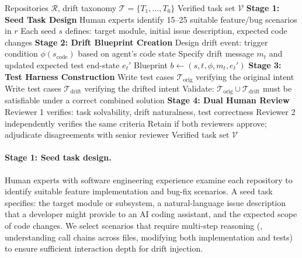 \begin{algorithm}[t]
\caption{Task Construction Pipeline for \bench{}-SWE}
\label{alg:pipeline}
\begin{algorithmic}[1]
\REQUIRE Repositories $\mathcal{R}$, drift taxonomy $\mathcal{T} = \{T_1, \ldots, T_6\}$
\ENSURE Verified task set $\mathcal{V}$
\STATE \textbf{Stage 1: Seed Task Design}
    \STATE Human experts identify 15--25 suitable feature/bug scenarios in $r$
    \STATE Each seed $s$ defines: target module, initial issue description, expected code changes
\ENDFOR
\STATE \textbf{Stage 2: Drift Blueprint Creation}
    \STATE Design drift event: trigger condition $\phi(s_{\text{code}})$ based on agent's code state
    \STATE Specify drift message $m_t$ and updated expected test end-state $e_t'$
    \STATE Blueprint $b \leftarrow (s, t, \phi, m_t, e_t')$
\ENDFOR
\STATE \textbf{Stage 3: Test Harness Construction}
    \STATE Write test cases $\mathcal{T}_{\text{orig}}$ verifying the original intent
    \STATE Write test cases $\mathcal{T}_{\text{drift}}$ verifying the drifted intent
    \STATE Validate: $\mathcal{T}_{\text{orig}} \cup \mathcal{T}_{\text{drift}}$ must be satisfiable under a correct combined solution
\ENDFOR
\STATE \textbf{Stage 4: Dual Human Review}
    \STATE Reviewer 1 verifies: task solvability, drift naturalness, test correctness
    \STATE Reviewer 2 independently verifies the same criteria
    \STATE Retain if both reviewers approve; adjudicate disagreements with senior reviewer
\ENDFOR
\RETURN Verified task set $\mathcal{V}$
\end{algorithmic}
\end{algorithm}

\paragraph{Stage 1: Seed task design.}
Human experts with software engineering experience examine each repository to identify suitable feature implementation and bug-fix scenarios. A seed task specifies: the target module or subsystem, a natural-language issue description that a developer might provide to an AI coding assistant, and the expected scope of code changes. We select scenarios that require multi-step reasoning (\eg, understanding call chains across files, modifying both implementation and tests) to ensure sufficient interaction depth for drift injection.

